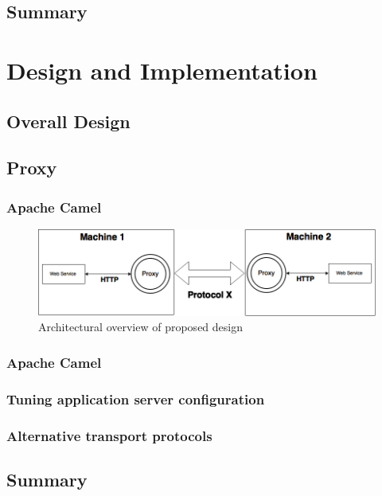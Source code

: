 \documentclass[USenglish]{ifimaster}
\begin{document}
\section{Summary}



\chapter{Design and Implementation}
\section{Overall Design}
\section{Proxy}
\subsection{Apache Camel}
\begin{figure}[h]
\includegraphics[scale=0.4]{images/architecture.png}
\caption{Architectural overview of proposed design}
\end{figure}

\subsection{Apache Camel}

\subsection{Tuning application server configuration}

\subsection{Alternative transport protocols}

\section{Summary}
\end{document}
